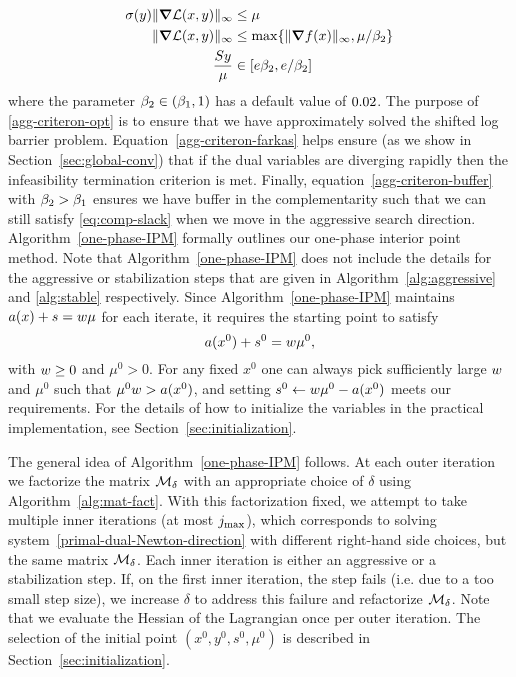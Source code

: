 \documentclass{article}
\begin{document}
\begin{subequations}\label{agg-criteron}
\begin{flalign}
\sigma (y) \| \grad \mathcal{L}(x, y) \|_{\infty} &\le \mu   \label{agg-criteron-opt} \\
\| \grad \mathcal{L}(x, y) \|_{\infty} &\le  \max\{ \| \grad f(x) \|_{\infty} ,  \mu / \beta_{2} \} \label{agg-criteron-farkas} \\
 \frac{S y}{\mu} &\in [ e \beta_{2}, e / \beta_{2} ] \label{agg-criteron-buffer}
\end{flalign}
\end{subequations}
where the parameter $\beta_{2} \in (\beta_{1}, 1)$ has a default value of $0.02$. The purpose of \eqref{agg-criteron-opt} is to ensure that we have approximately solved the shifted log barrier problem. Equation~\eqref{agg-criteron-farkas} helps ensure (as we show in Section~\ref{sec:global-conv}) that if the dual variables are diverging rapidly then the infeasibility termination criterion is met. Finally, equation~\eqref{agg-criteron-buffer} with $\beta_{2} > \beta_{1}$ ensures we have buffer in the complementarity such that we can still satisfy \eqref{eq:comp-slack} when we move in the aggressive search direction. Algorithm~\ref{one-phase-IPM} formally outlines our one-phase interior point method. Note that Algorithm~\ref{one-phase-IPM} does not include the details for the aggressive or stabilization steps that are given in Algorithm~\ref{alg:aggressive} and \ref{alg:stable} respectively. Since Algorithm~\ref{one-phase-IPM} maintains $a(x) + s = w \mu$ for each iterate, it requires the starting point to satisfy
$$
a(x^{0}) + s^{0} = w \mu^{0},
$$
with $w \ge 0$ and $\mu^{0} > 0$. For any fixed $x^{0}$ one can always pick sufficiently large $w$ and $\mu^{0}$ such that $\mu^{0} w > a(x^{0})$, and setting $s^{0} \gets w \mu^{0} - a(x^{0})$ meets our requirements. For the details of how to initialize the variables in the practical implementation, see Section~\ref{sec:initialization}.

The general idea of Algorithm~\ref{one-phase-IPM} follows. At each outer iteration we factorize the matrix $\mathcal{M}_{\delta}$ with an appropriate choice of $\delta$ using Algorithm~\ref{alg:mat-fact}. With this factorization fixed, we attempt to take multiple inner iterations (at most $j_{\max}$), which corresponds to solving system~\eqref{primal-dual-Newton-direction} with different right-hand side choices, but the same matrix $\mathcal{M}_{\delta}$. Each inner iteration is either an aggressive or a stabilization step. If, on the first inner iteration, the step fails (i.e. due to a too small step size), we increase $\delta$ to address this failure and refactorize $\mathcal{M}_{\delta}$. Note that we evaluate the Hessian of the Lagrangian once per outer iteration. The selection of the initial point $(x^{0}, y^{0}, s^{0}, \mu^{0})$ is described in Section~\ref{sec:initialization}.
\end{document}
